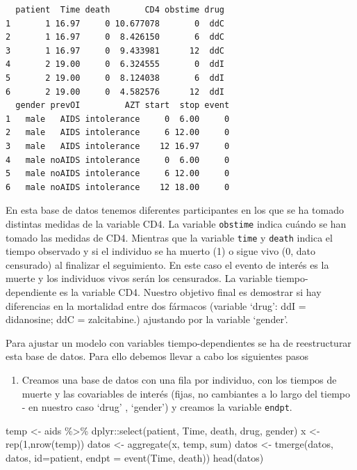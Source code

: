\documentclass[
]{book}
\newenvironment{Shaded}{\begin{snugshade}}{\end{snugshade}}
\newcommand{\AttributeTok}[1]{\textcolor[rgb]{0.77,0.63,0.00}{#1}}
\newcommand{\DecValTok}[1]{\textcolor[rgb]{0.00,0.00,0.81}{#1}}
\newcommand{\FunctionTok}[1]{\textcolor[rgb]{0.00,0.00,0.00}{#1}}
\newcommand{\NormalTok}[1]{#1}
\newcommand{\OtherTok}[1]{\textcolor[rgb]{0.56,0.35,0.01}{#1}}
\newcommand{\SpecialCharTok}[1]{\textcolor[rgb]{0.00,0.00,0.00}{#1}}
\providecommand{\tightlist}{%
  \setlength{\itemsep}{0pt}\setlength{\parskip}{0pt}}
\begin{document}
\begin{verbatim}
  patient  Time death       CD4 obstime drug
1       1 16.97     0 10.677078       0  ddC
2       1 16.97     0  8.426150       6  ddC
3       1 16.97     0  9.433981      12  ddC
4       2 19.00     0  6.324555       0  ddI
5       2 19.00     0  8.124038       6  ddI
6       2 19.00     0  4.582576      12  ddI
  gender prevOI         AZT start  stop event
1   male   AIDS intolerance     0  6.00     0
2   male   AIDS intolerance     6 12.00     0
3   male   AIDS intolerance    12 16.97     0
4   male noAIDS intolerance     0  6.00     0
5   male noAIDS intolerance     6 12.00     0
6   male noAIDS intolerance    12 18.00     0
\end{verbatim}

En esta base de datos tenemos diferentes participantes en los que se ha tomado distintas medidas de la variable CD4. La variable \texttt{obstime} indica cuándo se han tomado las medidas de CD4. Mientras que la variable \texttt{time} y \texttt{death} indica el tiempo observado y si el individuo se ha muerto (1) o sigue vivo (0, dato censurado) al finalizar el seguimiento. En este caso el evento de interés es la muerte y los individuos vivos serán los censurados. La variable tiempo-dependiente es la variable CD4. Nuestro objetivo final es demostrar si hay diferencias en la mortalidad entre dos fármacos (variable `drug': ddI = didanosine; ddC = zalcitabine.) ajustando por la variable `gender'.

Para ajustar un modelo con variables tiempo-dependientes se ha de reestructurar esta base de datos. Para ello debemos llevar a cabo los siguientes pasos

\begin{enumerate}
\def\labelenumi{\arabic{enumi}.}
\tightlist
\item
  Creamos una base de datos con una fila por individuo, con los tiempos de muerte y las covariables de interés (fijas, no cambiantes a lo largo del tiempo - en nuestro caso `drug' , `gender') y creamos la variable \texttt{endpt}.
\end{enumerate}

\begin{Shaded}
\begin{Highlighting}[]
\NormalTok{temp }\OtherTok{\textless{}{-}}\NormalTok{ aids }\SpecialCharTok{\%\textgreater{}\%}\NormalTok{ dplyr}\SpecialCharTok{::}\FunctionTok{select}\NormalTok{(patient, Time, death, drug, gender)}
\NormalTok{x }\OtherTok{\textless{}{-}} \FunctionTok{rep}\NormalTok{(}\DecValTok{1}\NormalTok{,}\FunctionTok{nrow}\NormalTok{(temp))}
\NormalTok{datos }\OtherTok{\textless{}{-}} \FunctionTok{aggregate}\NormalTok{(x, temp, sum)}
\NormalTok{datos }\OtherTok{\textless{}{-}} \FunctionTok{tmerge}\NormalTok{(datos, datos, }\AttributeTok{id=}\NormalTok{patient, }\AttributeTok{endpt =} \FunctionTok{event}\NormalTok{(Time, death))}
\FunctionTok{head}\NormalTok{(datos)}
\end{Highlighting}
\end{Shaded}
\end{document}
